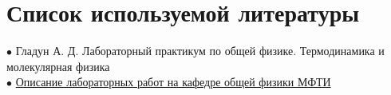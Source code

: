 \documentclass[a4paper, 12pt]{article} %
\begin{document}
\section{Список используемой литературы}

$\bullet$ Гладун А. Д. Лабораторный практикум по общей физике. Термодинамика и молекулярная физика\\

$\bullet$ \href{https://mipt.ru/education/chair/physics/S_II/lab/}{Описание лабораторных работ на кафедре общей физики МФТИ}
\end{document}
